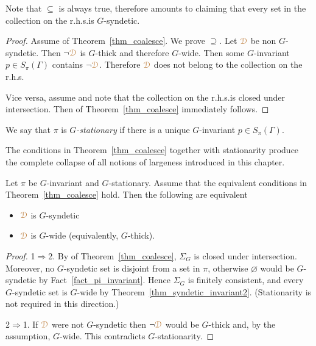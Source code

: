 Note that $\subseteq$ is always true, therefore  amounts to claiming that every set in the collection on the r.h.s.\@ is $G$-syndetic.\vspace*{-2ex}

\begin{proof} 
  Assume  of Theorem~\ref{thm_coalesce}.
  We prove $\supseteq$.
  Let ${\color{brown}\EuScript D}$ be non $G$-syndetic.
  Then $\neg{\color{brown}\EuScript D}$ is $G$-thick and therefore $G$-wide.
  Then some $G$-invariant $p\in S_\pi(\Gamma)$ contains $\neg{\color{brown}\EuScript D}$.
  Therefore ${\color{brown}\EuScript D}$ does not belong to the collection on the r.h.s.
  
  Vice versa, assume  and note that the collection on the r.h.s.\@ is closed under intersection.
  Then  of Theorem~\ref{thm_coalesce} immediately follows.
\end{proof}

We say that $\pi$ is \emph{$G$-stationary\/} if there is a unique $G$-in\-var\-iant $p\in S_\pi(\Gamma)$.


The conditions in Theorem~\ref{thm_coalesce} together with stationarity produce the complete collapse of all notions of largeness introduced in this chapter.

\begin{fact}\label{fact_stationarity}
  Let $\pi$ be $G$-invariant and $G$-stationary.
  Assume that the equivalent conditions in Theorem~\ref{thm_coalesce} hold.
  Then the following are equivalent
  \begin{itemize}
    \item [1.] ${\color{brown}\EuScript D}$ is $G$-syndetic
    \item [2.] ${\color{brown}\EuScript D}$ is $G$-wide (equivalently, $G$-thick).
  \end{itemize}
\end{fact}

\begin{proof}
  1$\Rightarrow$2.
  By  of Theorem~\ref{thm_coalesce}, $\Sigma_G$ is closed under intersection.
  Moreover, no $G$-syndetic set is disjoint from a set in $\pi$, otherwise $\varnothing$ would be $G$-syndetic by Fact~\ref{fact_pi_invariant}.
  Hence $\Sigma_G$ is finitely consistent, and every $G$-syndetic set is $G$-wide by Theorem~\ref{thm_syndetic_invariant2}.
  (Stationarity is not required in this direction.)

  2$\Rightarrow$1.
  If ${\color{brown}\EuScript D}$ were not $G$-syndetic then $\neg{\color{brown}\EuScript D}$ would be $G$-thick and, by the assumption, $G$-wide.
  This contradicts $G$-stationarity.
\end{proof}


